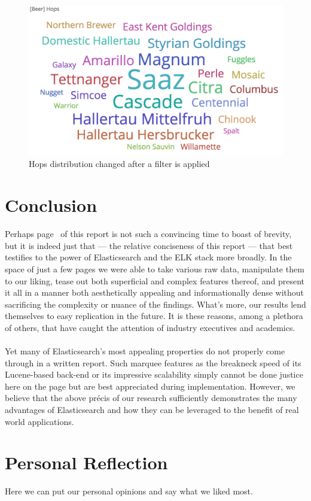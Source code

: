 \documentclass[bibliography=totoc]{article}
\begin{document}
\begin{figure}
  \centering
  \includegraphics[width=\linewidth]{beer_hops_after.png}
 \caption{Hops distribution changed after a filter is applied}
  \label{fig:beer_hops_after}
\end{figure}

\section{Conclusion}
Perhaps page \thepage\ of this report is not such a convincing time to boast of brevity, but it is
indeed just that — the relative conciseness of this report — that best testifies to the power of Elasticsearch
and the ELK stack more broadly. In the space of just a few pages we were able to take various raw data,
manipulate them to our liking, tease out both superficial and complex features thereof, and present it all in
a manner both aesthetically appealing and informationally dense without sacrificing the complexity or nuance
of the findings. What's more, our results lend themselves to easy replication in the future. It is these
reasons, among a plethora of others, that have caught the attention of industry executives and academics.
\\
\\
Yet many of Elasticsearch's most appealing properties do not properly come through in a written report.
Such marquee features as the breakneck speed of its Lucene-based back-end or its impressive scalability
simply cannot be done justice here on the page but are best appreciated during implementation. However, we
believe that the above précis of our research sufficiently demonstrates the many advantages of Elasticsearch
and how they can be leveraged to the benefit of real world applications.

\section{Personal Reflection}
Here we can put our personal opinions and say what we liked most.
\end{document}

